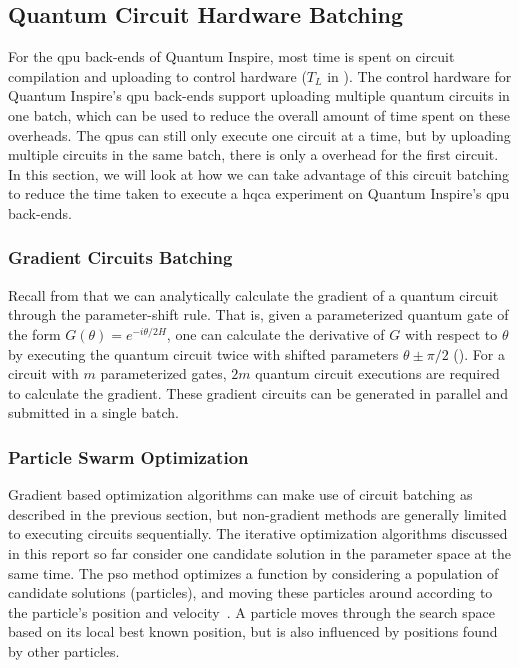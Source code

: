 \subsection{Quantum Circuit Hardware Batching} \label{sec:circuit-batching}
For the \gls{qpu} back-ends of Quantum Inspire, most time is spent on circuit compilation and uploading to control hardware ($T_L$ in ).
The control hardware for Quantum Inspire's \gls{qpu} back-ends support uploading multiple quantum circuits in one batch, which can be used to reduce the overall amount of time spent on these overheads.
The \glspl{qpu} can still only execute one circuit at a time, but by uploading multiple circuits in the same batch, there is only a overhead for the first circuit.
In this section, we will look at how we can take advantage of this circuit batching to reduce the time taken to execute a \gls{hqca} experiment on Quantum Inspire's \gls{qpu} back-ends.

\subsubsection{Gradient Circuits Batching}
Recall from  that we can analytically calculate the gradient of a quantum circuit through the parameter-shift rule.
That is, given a parameterized quantum gate of the form $G(\theta) = e^{-i\theta/2 H}$, one can calculate the derivative of $G$ with respect to $\theta$ by executing the quantum circuit twice with shifted parameters $\theta \pm \pi/2$ ().
For a circuit with $m$ parameterized gates, $2m$ quantum circuit executions are required to calculate the gradient.
These gradient circuits can be generated in parallel and submitted in a single batch.

\subsubsection{Particle Swarm Optimization}
Gradient based optimization algorithms can make use of circuit batching as described in the previous section, but non-gradient methods are generally limited to executing circuits sequentially.
The iterative optimization algorithms discussed in this report so far consider one candidate solution in the parameter space at the same time.
The \gls{pso} method optimizes a function by considering a population of candidate solutions (particles), and moving these particles around according to  the particle's position and velocity~\cite{kennedy1995particle, shi1998modified}.
A particle moves through the search space based on its local best known position, but is also influenced by positions found by other particles.

